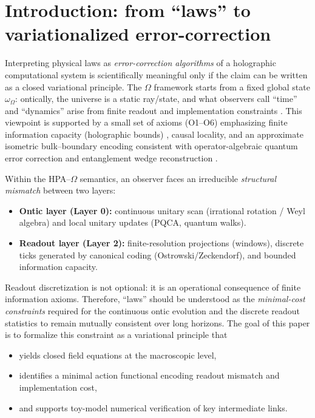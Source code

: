 \section{Introduction: from ``laws'' to variationalized error-correction}
\label{sec:introduction}

Interpreting physical laws as \emph{error-correction algorithms} of a holographic computational system is scientifically meaningful only if the claim can be written as a closed variational principle. The $\Omega$ framework starts from a fixed global state $\omega_{\Omega}$: ontically, the universe is a static ray/state, and what observers call ``time'' and ``dynamics'' arise from finite readout and implementation constraints \cite{Ma2025FoP,Ma2025HPOT}. This viewpoint is supported by a small set of axioms (O1--O6) emphasizing finite information capacity (holographic bounds) \cite{tHooft1993,Susskind1995,Bousso2002}, causal locality, and an approximate isometric bulk--boundary encoding consistent with operator-algebraic quantum error correction and entanglement wedge reconstruction \cite{AlmheiriDongHarlow2015,Pastawski2015,Harlow2017}.

Within the HPA--$\Omega$ semantics, an observer faces an irreducible \emph{structural mismatch} between two layers:
\begin{itemize}
  \item \textbf{Ontic layer (Layer 0):} continuous unitary scan (irrational rotation / Weyl algebra) and local unitary updates (PQCA, quantum walks).
  \item \textbf{Readout layer (Layer 2):} finite-resolution projections (windows), discrete ticks generated by canonical coding (Ostrowski/Zeckendorf), and bounded information capacity.
\end{itemize}

\noindent Readout discretization is not optional: it is an operational consequence of finite information axioms. Therefore, ``laws'' should be understood as the \emph{minimal-cost constraints} required for the continuous ontic evolution and the discrete readout statistics to remain mutually consistent over long horizons. The goal of this paper is to formalize this constraint as a variational principle that
\begin{itemize}
  \item yields closed field equations at the macroscopic level,
  \item identifies a minimal action functional encoding readout mismatch and implementation cost,
  \item and supports toy-model numerical verification of key intermediate links.
\end{itemize}


